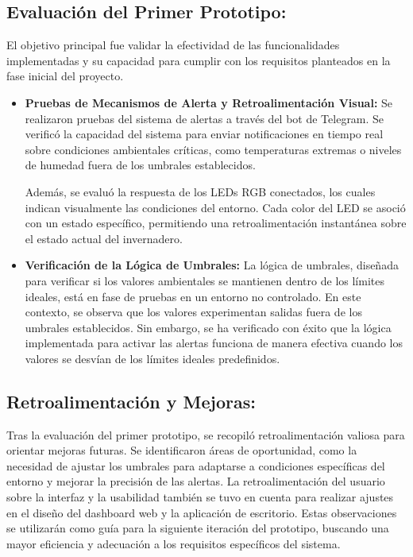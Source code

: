 \subsection{Evaluación del Primer Prototipo:}
El objetivo principal fue validar la efectividad de las funcionalidades implementadas y su capacidad para cumplir con los requisitos planteados en la fase inicial del proyecto.
\begin{itemize}
	\item \textbf{Pruebas de Mecanismos de Alerta y Retroalimentación Visual:}
Se realizaron pruebas del sistema de alertas a través del bot de Telegram. Se verificó la capacidad del sistema para enviar notificaciones en tiempo real sobre condiciones ambientales críticas, como temperaturas extremas o niveles de humedad fuera de los umbrales establecidos.

Además, se evaluó la respuesta de los LEDs RGB conectados, los cuales indican visualmente las condiciones del entorno. Cada color del LED se asoció con un estado específico, permitiendo una retroalimentación instantánea sobre el estado actual del invernadero.
\item \textbf{Verificación de la Lógica de Umbrales:}
La lógica de umbrales, diseñada para verificar si los valores ambientales se mantienen dentro de los límites ideales, está en fase de pruebas en un entorno no controlado. En este contexto, se observa que los valores experimentan salidas fuera de los umbrales establecidos. Sin embargo, se ha verificado con éxito que la lógica implementada para activar las alertas funciona de manera efectiva cuando los valores se desvían de los límites ideales predefinidos.
\end{itemize}
\subsection{Retroalimentación y Mejoras:}
Tras la evaluación del primer prototipo, se recopiló retroalimentación valiosa para orientar mejoras futuras. Se identificaron áreas de oportunidad, como la necesidad de ajustar los umbrales para adaptarse a condiciones específicas del entorno y mejorar la precisión de las alertas. La retroalimentación del usuario sobre la interfaz y la usabilidad también se tuvo en cuenta para realizar ajustes en el diseño del dashboard web y la aplicación de escritorio. Estas observaciones se utilizarán como guía para la siguiente iteración del prototipo, buscando una mayor eficiencia y adecuación a los requisitos específicos del sistema.

